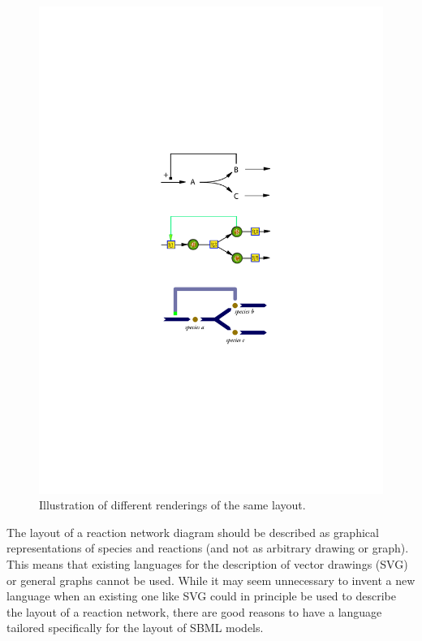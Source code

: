 \begin{center}
\begin{figure}[!h]
\begin{center}
\includegraphics[scale=1]{figures/layout1}
\end{center}
\caption{Illustration of different renderings of the same layout.}
\label{UML:All}
\label{figure:rendering}
\end{figure}
\end{center}

The layout of a reaction network diagram should be described as graphical representations of species and reactions (and not as arbitrary drawing or graph). This means that existing languages for the description of vector drawings (SVG) or general graphs cannot be used. While it may seem unnecessary to invent a new language when an existing one like SVG could in principle be used to describe the layout of a reaction network, there are good reasons to have a language tailored specifically for the layout of SBML models.  

